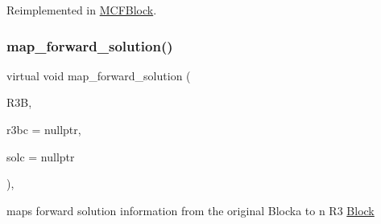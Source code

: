 Reimplemented in \mbox{\hyperlink{class_s_m_spp__di__unipi__it_1_1_m_c_f_block_a97c60b41fa6562804000b7324576ae31}{M\+C\+F\+Block}}.

\mbox{\label{class_s_m_spp__di__unipi__it_1_1_block_a7759467d70613a10c1cdb5d3193b4434}} 
\subsubsection{\texorpdfstring{map\+\_\+forward\+\_\+solution()}{map\_forward\_solution()}}
{\footnotesize\ttfamily virtual void map\+\_\+forward\+\_\+solution (\begin{DoxyParamCaption}\item[{\mbox{\hyperlink{class_s_m_spp__di__unipi__it_1_1_block}{Block}} $\ast$}]{R3B,  }\item[{\mbox{\hyperlink{class_s_m_spp__di__unipi__it_1_1_configuration}{Configuration}} $\ast$}]{r3bc = {\ttfamily nullptr},  }\item[{\mbox{\hyperlink{class_s_m_spp__di__unipi__it_1_1_configuration}{Configuration}} $\ast$}]{solc = {\ttfamily nullptr} }\end{DoxyParamCaption})\hspace{0.3cm}{\ttfamily [inline]}, {\ttfamily [virtual]}}



maps forward solution information from the original Blocka to n R3 \mbox{\hyperlink{class_s_m_spp__di__unipi__it_1_1_block}{Block}} 

